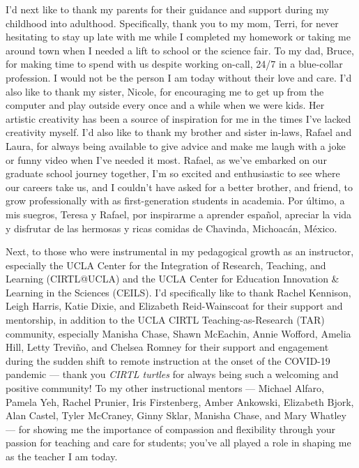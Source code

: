 {I'd next like to thank my parents for their guidance and support during my childhood into adulthood. Specifically, thank you to my mom, Terri, for never hesitating to stay up late with me while I completed my homework or taking me around town when I needed a lift to school or the science fair. To my dad, Bruce, for making time to spend with us despite working on-call, 24/7 in a blue-collar profession. I would not be the person I am today without their love and care. I'd also like to thank my sister, Nicole, for encouraging me to get up from the computer and play outside every once and a while when we were kids. Her artistic creativity has been a source of inspiration for me in the times I've lacked creativity myself. I'd also like to thank my brother and sister in-laws, Rafael and Laura, for always being available to give advice and make me laugh with a joke or funny video when I've needed it most. Rafael, as we've embarked on our graduate school journey together, I'm so excited and enthusiastic to see where our careers take us, and I couldn't have asked for a better brother, and friend, to grow professionally with as first-generation students in academia. Por último, a mis suegros, Teresa y Rafael, por inspirarme a aprender español, apreciar la vida y disfrutar de las hermosas y ricas comidas de Chavinda, Michoacán, México.

Next, to those who were instrumental in my pedagogical growth as an instructor, especially the UCLA Center for the Integration of Research, Teaching, and Learning (CIRTL@UCLA) and the UCLA Center for Education Innovation \& Learning in the Sciences (CEILS). I'd specifically like to thank Rachel Kennison, Leigh Harris, Katie Dixie, and Elizabeth Reid-Wainscoat for their support and mentorship, in addition to the UCLA CIRTL Teaching-as-Research (TAR) community, especially Manisha Chase, Shawn McEachin, Annie Wofford, Amelia Hill, Letty Treviño, and Chelsea Romney for their support and engagement during the sudden shift to remote instruction at the onset of the COVID-19 pandemic --- thank you \emph{CIRTL turtles} for always being such a welcoming and positive community! To my other instructional mentors --- Michael Alfaro, Pamela Yeh, Rachel Prunier, Iris Firstenberg, Amber Ankowski, Elizabeth Bjork, Alan Castel, Tyler McCraney, Ginny Sklar, Manisha Chase, and Mary Whatley  --- for showing me the importance of compassion and flexibility through your passion for teaching and care for students; you've all played a role in shaping me as the teacher I am today.

}
